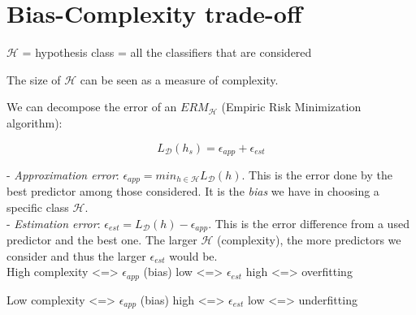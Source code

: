 \section*{Bias-Complexity trade-off}

\label{sec:bias-complexity-trade-off}

\vspace{5mm}

$\mathcal{H}$ = hypothesis class = all the classifiers that are considered

The size of $\mathcal{H}$ can be seen as a measure of complexity.

\vspace{5mm}

We can decompose the error of an $ERM_\mathcal{H}$ (Empiric Risk Minimization algorithm):

$$L_{\mathcal{D}}(h_s) = \epsilon_{app} + \epsilon_{est}$$

- \textit{Approximation error}: $\epsilon_{app} = min_{h \in \mathcal{H}} L_{\mathcal{D}}(h)$. This is the error done by the best predictor among those considered. It is the \textit{bias} we have in choosing a specific class $\mathcal{H}$. \\

- \textit{Estimation error}: $\epsilon_{est} = L_{\mathcal{D}}(h) - \epsilon_{app}$. This is the error difference from a used predictor and the best one. The larger $\mathcal{H}$ (complexity), the more predictors we consider and thus the larger $\epsilon_{est}$ would be. \\

High complexity <=> $\epsilon_{app}$ (bias) low <=> $\epsilon_{est}$ high <=> overfitting

Low complexity <=> $\epsilon_{app}$ (bias) high <=> $\epsilon_{est}$ low <=> underfitting

\vspace{5mm}